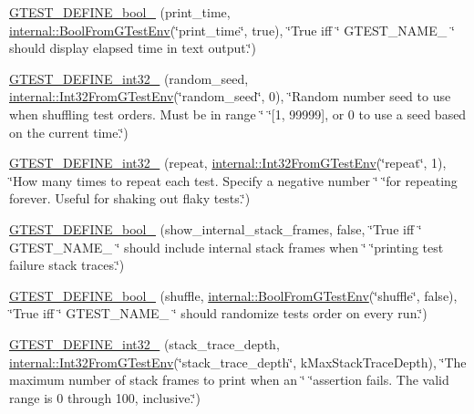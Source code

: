 \begin{DoxyCompactItemize}
\item 
\hyperlink{namespacetesting_a766fcba2ec951940e528276919a5d22f}{G\+T\+E\+S\+T\+\_\+\+D\+E\+F\+I\+N\+E\+\_\+bool\+\_\+} (print\+\_\+time, \hyperlink{namespacetesting_1_1internal_a67132cdce23fb71b6c38ee34ef81eb4c}{internal\+::\+Bool\+From\+G\+Test\+Env}(\char`\"{}print\+\_\+time\char`\"{}, true), \char`\"{}True iff \char`\"{} G\+T\+E\+S\+T\+\_\+\+N\+A\+M\+E\+\_\+ \char`\"{} should display elapsed time in text output.\char`\"{})
\item 
\hyperlink{namespacetesting_a9900d8db2670a26999fbc2a9130f7185}{G\+T\+E\+S\+T\+\_\+\+D\+E\+F\+I\+N\+E\+\_\+int32\+\_\+} (random\+\_\+seed, \hyperlink{namespacetesting_1_1internal_a0f7e728793f9e6cb0aa2b69eaa468bf3}{internal\+::\+Int32\+From\+G\+Test\+Env}(\char`\"{}random\+\_\+seed\char`\"{}, 0), \char`\"{}Random number seed to use when shuffling test orders.  Must be in range \char`\"{} \char`\"{}\mbox{[}1, 99999\mbox{]}, or 0 to use a seed based on the current time.\char`\"{})
\item 
\hyperlink{namespacetesting_aae6f1140f03d7bf24067df0f6628e9ea}{G\+T\+E\+S\+T\+\_\+\+D\+E\+F\+I\+N\+E\+\_\+int32\+\_\+} (repeat, \hyperlink{namespacetesting_1_1internal_a0f7e728793f9e6cb0aa2b69eaa468bf3}{internal\+::\+Int32\+From\+G\+Test\+Env}(\char`\"{}repeat\char`\"{}, 1), \char`\"{}How many times to repeat each test.  Specify a negative number \char`\"{} \char`\"{}for repeating forever.  Useful for shaking out flaky tests.\char`\"{})
\item 
\hyperlink{namespacetesting_a60ef38aa9d1437f0d7818181897af8ef}{G\+T\+E\+S\+T\+\_\+\+D\+E\+F\+I\+N\+E\+\_\+bool\+\_\+} (show\+\_\+internal\+\_\+stack\+\_\+frames, false, \char`\"{}True iff \char`\"{} G\+T\+E\+S\+T\+\_\+\+N\+A\+M\+E\+\_\+ \char`\"{} should include internal stack frames when \char`\"{} \char`\"{}printing test failure stack traces.\char`\"{})
\item 
\hyperlink{namespacetesting_af95276e3deb9d243d729f3043eabd272}{G\+T\+E\+S\+T\+\_\+\+D\+E\+F\+I\+N\+E\+\_\+bool\+\_\+} (shuffle, \hyperlink{namespacetesting_1_1internal_a67132cdce23fb71b6c38ee34ef81eb4c}{internal\+::\+Bool\+From\+G\+Test\+Env}(\char`\"{}shuffle\char`\"{}, false), \char`\"{}True iff \char`\"{} G\+T\+E\+S\+T\+\_\+\+N\+A\+M\+E\+\_\+ \char`\"{} should randomize tests\textquotesingle{} order on every run.\char`\"{})
\item 
\hyperlink{namespacetesting_a84af642630c9181f00fcf0a4a63e795e}{G\+T\+E\+S\+T\+\_\+\+D\+E\+F\+I\+N\+E\+\_\+int32\+\_\+} (stack\+\_\+trace\+\_\+depth, \hyperlink{namespacetesting_1_1internal_a0f7e728793f9e6cb0aa2b69eaa468bf3}{internal\+::\+Int32\+From\+G\+Test\+Env}(\char`\"{}stack\+\_\+trace\+\_\+depth\char`\"{}, k\+Max\+Stack\+Trace\+Depth), \char`\"{}The maximum number of stack frames to print when an \char`\"{} \char`\"{}assertion fails.  The valid range is 0 through 100, inclusive.\char`\"{})

\end{DoxyCompactItemize}
